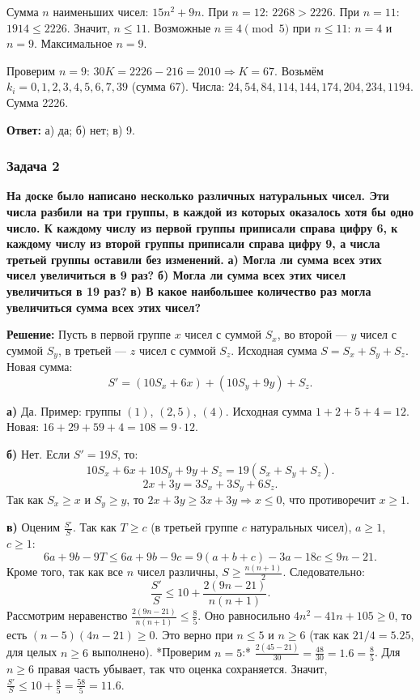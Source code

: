 \documentclass[12pt, a4paper]{article}
\begin{document}
Сумма \(n\) наименьших чисел: \(15n^2 + 9n\). При \(n=12\): \(2268 > 2226\). При \(n=11\): \(1914 \le 2226\). Значит, \(n \le 11\). Возможные \(n \equiv 4 \pmod{5}\) при \(n \le 11\): \(n=4\) и \(n=9\). Максимальное \(n=9\).

Проверим \(n=9\): \(30K = 2226 - 216 = 2010 \Rightarrow K = 67\). Возьмём \(k_i = 0,1,2,3,4,5,6,7,39\) (сумма 67). Числа: \(24, 54, 84, 114, 144, 174, 204, 234, 1194\). Сумма 2226.

\textbf{Ответ:} а) да; б) нет; в) 9.

\subsubsection*{Задача 2}
\textbf{На доске было написано несколько различных натуральных чисел. Эти числа разбили на три группы, в каждой из которых оказалось хотя бы одно число. К каждому числу из первой группы приписали справа цифру 6, к каждому числу из второй группы приписали справа цифру 9, а числа третьей группы оставили без изменений.}
\textbf{а) Могла ли сумма всех этих чисел увеличиться в 9 раз?}
\textbf{б) Могла ли сумма всех этих чисел увеличиться в 19 раз?}
\textbf{в) В какое наибольшее количество раз могла увеличиться сумма всех этих чисел?}

\textbf{Решение:}
Пусть в первой группе \(x\) чисел с суммой \(S_x\), во второй — \(y\) чисел с суммой \(S_y\), в третьей — \(z\) чисел с суммой \(S_z\). Исходная сумма \(S = S_x + S_y + S_z\). Новая сумма:
\[
S' = (10S_x + 6x) + (10S_y + 9y) + S_z.
\]

\textbf{а)} Да. Пример: группы \((1)\), \((2, 5)\), \((4)\). Исходная сумма \(1+2+5+4=12\). Новая: \(16 + 29 + 59 + 4 = 108 = 9 \cdot 12\).

\textbf{б)} Нет. Если \(S' = 19S\), то:
\[
10S_x + 6x + 10S_y + 9y + S_z = 19(S_x + S_y + S_z).
\]
\[
2x + 3y = 3S_x + 3S_y + 6S_z.
\]
Так как \(S_x \ge x\) и \(S_y \ge y\), то \(2x+3y \ge 3x+3y \Rightarrow x \le 0\), что противоречит \(x \ge 1\).

\textbf{в)} Оценим \(\frac{S'}{S}\). Так как \(T \ge c\) (в третьей группе \(c\) натуральных чисел), \(a \ge 1\), \(c \ge 1\):
\[
6a + 9b - 9T \le 6a + 9b - 9c = 9(a+b+c) - 3a - 18c \le 9n - 21.
\]
Кроме того, так как все \(n\) чисел различны, \(S \ge \frac{n(n+1)}{2}\). Следовательно:
\[
\frac{S'}{S} \le 10 + \frac{2(9n - 21)}{n(n+1)}.
\]
Рассмотрим неравенство \(\frac{2(9n-21)}{n(n+1)} \le \frac{8}{5}\). Оно равносильно \(4n^2 - 41n + 105 \ge 0\), то есть \((n-5)(4n-21) \ge 0\). Это верно при \(n \le 5\) и \(n \ge 6\) (так как \(21/4 = 5.25\), для целых \(n \ge 6\) выполнено).
*Проверим \(n=5\):* \(\frac{2(45-21)}{30} = \frac{48}{30} = 1.6 = \frac{8}{5}\). Для \(n \ge 6\) правая часть убывает, так что оценка сохраняется.
Значит, \(\frac{S'}{S} \le 10 + \frac{8}{5} = \frac{58}{5} = 11.6\).
\end{document}

